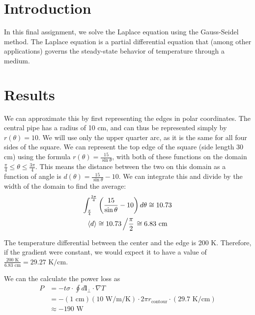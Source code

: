\documentclass{article}
\author{\hwauthor}
\title{\hwtitle}
\date{\hwdate}
\begin{document}
\maketitle
\thispagestyle{fancy}

\section{Introduction}

In this final assignment, we solve the Laplace equation using the Gauss-Seidel method. The Laplace equation is a partial differential equation that (among other applications) governs the steady-state behavior of temperature through a medium.

\section{Results}

\bigskip
{}
\medskip

We can approximate this by first representing the edges in polar coordinates. The central pipe has a radius of 10 cm, and can thus be represented simply by $r(\theta) = 10$. We will use only the upper quarter arc, as it is the same for all four sides of the square. We can represent the top edge of the square (side length 30 cm) using the formula $r(\theta)=\frac{15}{\sin\theta}$, with both of these functions on the domain $\frac{\pi}{4}\leq \theta \leq \frac{3\pi}{4}$. This means the distance between the two on this domain as a function of angle is $d(\theta)=\frac{15}{\sin\theta}-10$. We can integrate this and divide by the width of the domain to find the average: \begin{gather*}
    \int_{\pi\over 4}^{3\pi\over 4} \left(\frac{15}{\sin\theta}-10\right)d\theta \cong 10.73 \\
    \langle d \rangle \cong 10.73\left/\frac{\pi}{2}\right. \cong 6.83\text{ cm}
\end{gather*}

The temperature differential between the center and the edge is 200 K. Therefore, if the gradient were constant, we would expect it to have a value of $\displaystyle \frac{200\text{ K}}{6.83\text{ cm}}=29.27\text{ K/cm}$.

We can the calculate the power loss as \begin{align*}
    P &= -t\sigma \cdot \oint d\mathbf{l}_\perp \cdot \nabla T \\
    &= -(1\text{ cm})(10\text{ W/m/K}) \cdot 2\pi r_\text{contour} \cdot (29.7\text{ K/cm}) \\
    &\approx \boxed{-190\text{ W}}
\end{align*}
\end{document}
